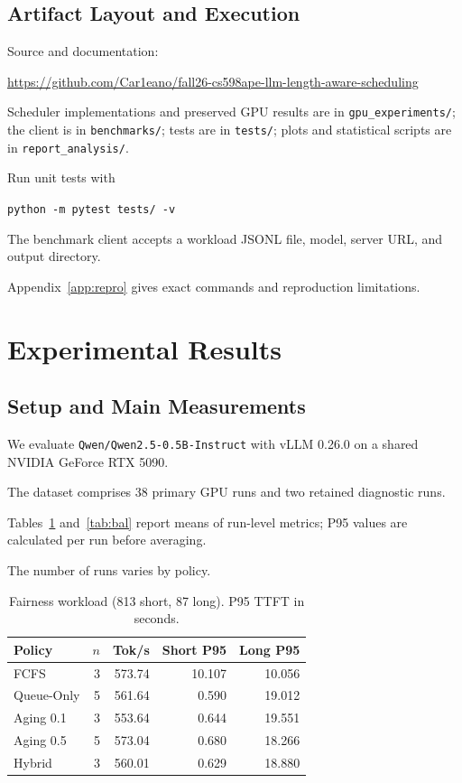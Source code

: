 \documentclass[sigplan,nonacm]{acmart}
\begin{document}
\subsection{Artifact Layout and Execution}

Source and documentation:

\url{https://github.com/Car1eano/fall26-cs598ape-llm-length-aware-scheduling}

Scheduler implementations and preserved GPU
results are in \texttt{gpu\_experiments/};
the client is in \texttt{benchmarks/};
tests are in \texttt{tests/};
plots and statistical scripts are in
\texttt{report\_analysis/}.

Run unit tests with

\begin{center}
\texttt{python -m pytest tests/ -v}
\end{center}

The benchmark client accepts a workload JSONL
file, model, server URL, and output directory.

Appendix~\ref{app:repro} gives exact commands
and reproduction limitations.


\section{Experimental Results}

\subsection{Setup and Main Measurements}

We evaluate
\texttt{Qwen/Qwen2.5-0.5B-Instruct}
with vLLM 0.26.0 on a shared
NVIDIA GeForce RTX 5090.

The dataset comprises 38 primary GPU runs
and two retained diagnostic runs.

Tables~\ref{tab:fair} and~\ref{tab:bal}
report means of run-level metrics;
P95 values are calculated per run
before averaging.

The number of runs varies by policy.

\begin{table}[t]
\centering
\caption{
Fairness workload (813 short, 87 long).
P95 TTFT in seconds.
}
\label{tab:fair}
\scriptsize
\setlength{\tabcolsep}{3pt}
\begin{tabular}{lrrrr}
\toprule
Policy & $n$ & Tok/s & Short P95 & Long P95\\
\midrule
FCFS & 3 & 573.74 & 10.107 & 10.056\\
Queue-Only & 5 & 561.64 & 0.590 & 19.012\\
Aging 0.1 & 3 & 553.64 & 0.644 & 19.551\\
Aging 0.5 & 5 & 573.04 & 0.680 & 18.266\\
Hybrid & 3 & 560.01 & 0.629 & 18.880\\
\bottomrule
\end{tabular}
\end{table}
\end{document}
